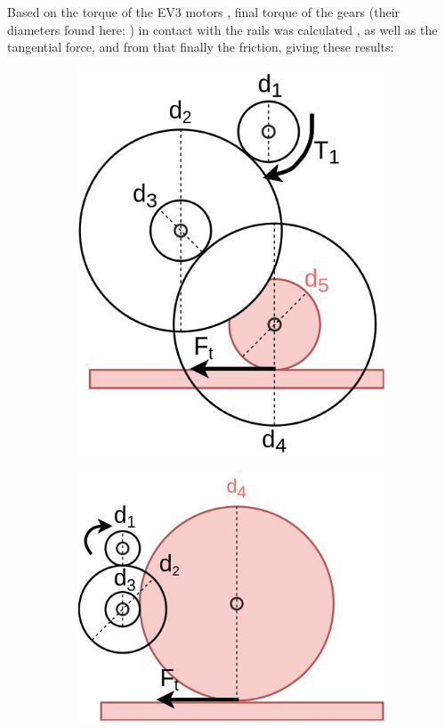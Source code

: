 \documentclass{article}
\begin{document}
Based on the torque of the EV3 motors \cite{motors2}, final torque of the gears (their diameters found here: \cite{gears}) in contact with the rails was calculated \cite{calc}, as well as the tangential force, and from that finally the friction, giving these results:
\vspace{-3mm}
\begin{figure}[h]
\begin{subfigure}[b]{0.25\columnwidth}
\centerline{\includegraphics[width=\linewidth]{figs-demo2/HEADGEARS.jpg}}
\caption{}
\end{subfigure}
\begin{subfigure}[b]{0.25\columnwidth}
\centerline{\includegraphics[width=\linewidth]{figs-demo2/BASEGEARS.jpg}}

\end{subfigure}
\end{figure}
\end{document}

